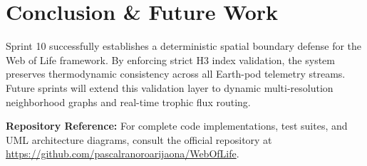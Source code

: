 \documentclass[11pt, a4paper]{article}
\begin{document}
\section{Conclusion \& Future Work}
Sprint 10 successfully establishes a deterministic spatial boundary defense for the Web of Life framework. By enforcing strict H3 index validation, the system preserves thermodynamic consistency across all Earth-pod telemetry streams. Future sprints will extend this validation layer to dynamic multi-resolution neighborhood graphs and real-time trophic flux routing.

\vspace{1em}
\noindent\textbf{Repository Reference:} For complete code implementations, test suites, and UML architecture diagrams, consult the official repository at \url{https://github.com/pascalranoroarijaona/WebOfLife}.
\end{document}
